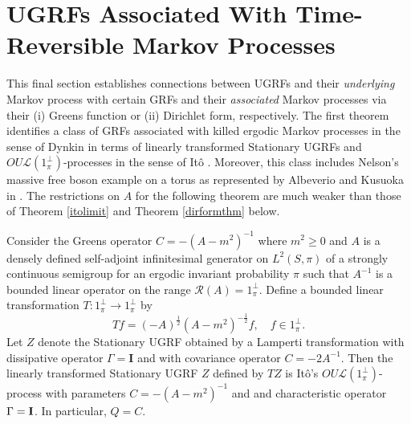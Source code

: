 \documentclass[11pt]{article}
\numberwithin{equation}{section}
\theoremstyle{definition}
\theoremstyle{remark}
\theoremstyle{definition}
\begin{document}
\section{UGRFs Associated With Time-Reversible Markov Processes}\label{mainsec}
This final section establishes connections between UGRFs
and their {\it underlying} Markov process  with
certain GRFs
and their {\it associated} Markov processes via their (i) Greens function or
(ii) Dirichlet form, respectively. 
The first theorem identifies a  class of 
GRFs associated with killed
ergodic Markov processes in the sense of Dynkin 
in terms of linearly transformed Stationary UGRFs and
$OU\mathcal{L}(1_\pi^\perp)$-processes in the sense of It\^o \cite{ito}. 
Moreover, this class includes Nelson’s massive free boson
example on a torus as represented by Albeverio and Kusuoka 
in \cite{albeveriokus}.  The restrictions on $A$ for the following
theorem are much weaker than those of Theorem \ref{itolimit}
and Theorem \ref{dirformthm} below. 
\begin{thm}\label{dynkinugrf} 
Consider the Greens operator $C=-(A-m^2)^{-1}$ 
where $m^2\ge 0$ and $A$ is  a densely defined self-adjoint infinitesimal
generator  on $L^2(S,\pi)$ of a strongly continuous semigroup
for an ergodic invariant probability $\pi$
such
that $ A^{-1}$ is a bounded linear operator on the range
$\mathcal{R}(A)=1_\pi^\perp$.
 Define a bounded linear transformation $T:1_\pi^\perp\to 1_\pi^\perp$ 
by
\begin{equation}
Tf = %
(-A)^{\frac{1}{2}}(A-m^2)^{-\frac{1}{2}}f, \quad f\in 1_\pi^\perp.
\end{equation}
Let $Z$ denote the Stationary UGRF obtained
by a Lamperti transformation with dissipative 
operator $\Gamma={\mathbf I}$ 
and with covariance operator $C = -2A^{-1}$.
Then the linearly transformed Stationary UGRF
 $Z$ defined by $TZ$
 is It\^o's $OU\mathcal{L}(1_\pi^\perp)$-process  with 
parameters
$C=-(A-m^2)^{-1}$ and
and characteristic operator $\Gamma = {\bf I}$. 
In particular,  $Q=C$.
\end{thm}
\end{document}
